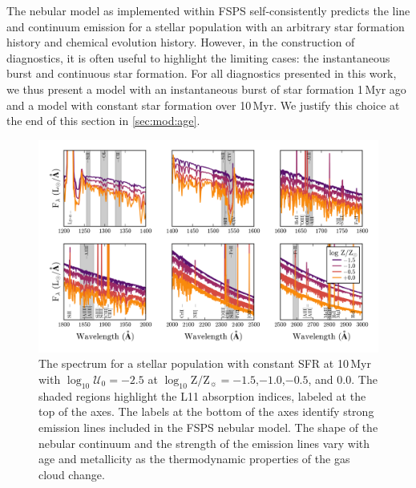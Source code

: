 \documentclass[preprint2,trackchanges]{aastex62}
\newcommand{\FSPS}{{\sc FSPS}\xspace}
\newcommand{\Myr}{$\,$Myr\xspace}
\newcommand{\logten}{\ensuremath{\log_{10}}}
\newcommand{\logZeq}[1]{\ensuremath{\logten \mathrm{Z}/\mathrm{Z}_{\sun} = #1}}
\newcommand{\logUeq}[1]{\ensuremath{\logten \mathcal{U}_0 = #1}}
\begin{document}
The nebular model as implemented within \FSPS self-consistently predicts the line and continuum emission for a stellar population with an arbitrary star formation history and chemical evolution history. However, in the construction of diagnostics, it is often useful to highlight the limiting cases: the instantaneous burst and continuous star formation. For all diagnostics presented in this work, we thus present a model with an instantaneous burst of star formation 1\Myr ago and a model with constant star formation over 10\Myr. We justify this choice at the end of this section in \ref{sec:mod:age}.
\begin{figure}
  \begin{center}
    \includegraphics[width=\linewidth]{figs/f1.png}
    \caption{The spectrum for a stellar population with constant SFR at 10\Myr with \logUeq{-2.5} at \logZeq{-1.5},$-1.0$,$-0.5$, and $0.0$. The shaded regions highlight the L11 absorption indices, labeled at the top of the axes. The labels at the bottom of the axes identify strong emission lines included in the \FSPS nebular model. The shape of the nebular continuum and the strength of the emission lines vary with age and metallicity as the thermodynamic properties of the gas cloud change.}
    \label{fig:FullSpec}
  \end{center}
\end{figure}
\end{document}

